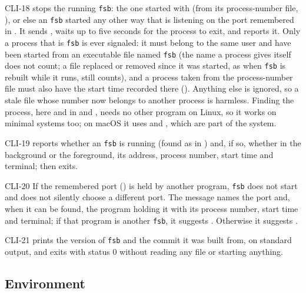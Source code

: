 \begin{req}{CLI-18}
 stops the running \texttt{fsb}: the one started with
 (from its process-number file, ), or else an
\texttt{fsb} started any other way that is listening on the port remembered in
.  It sends , waits up to five seconds for the process to
exit, and reports it.  Only a process that is \texttt{fsb} is ever signaled: it must
belong to the same user and have been started from an executable file named
\texttt{fsb} (the name a process gives itself does not count; a file replaced or
removed since it was started, as when \texttt{fsb} is rebuilt while it runs, still
counts), and a process taken from the process-number file must also have the start
time recorded there ().  Anything else is ignored, so a stale file whose number now
belongs to another process is harmless.  Finding the process, here and in
 and , needs no other program on Linux, so it works on minimal
systems too; on macOS it uses  and , which are part of the system.
\end{req}

\begin{req}{CLI-19}
 reports whether an \texttt{fsb} is running (found as in
) and, if so, whether in the background or the foreground, its address,
process number, start time and terminal; then exits.
\end{req}

\begin{req}{CLI-20}
If the remembered port () is held by another program, \texttt{fsb} does
not start and does not silently choose a different port.  The message names the
port and, when it can be found, the program holding it with its process number,
start time and terminal; if that program is another \texttt{fsb}, it suggests
.  Otherwise it suggests .
\end{req}

\begin{req}{CLI-21}
 prints the version of \texttt{fsb} and the commit it was built from,
on standard output, and exits with status 0 without reading any file or starting
anything.
\end{req}

\subsection{Environment}

